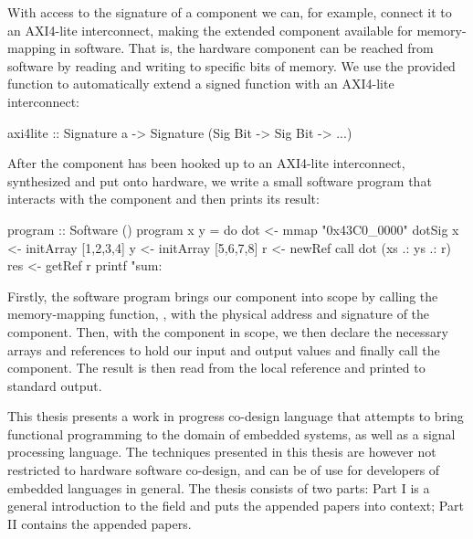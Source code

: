 \documentclass[../main.tex]{subfiles}
\begin{document}
With access to the signature of a component we can, for example, connect it to an AXI4-lite interconnect, making the extended component available for memory-mapping in software. That is, the hardware component can be reached from software by reading and writing to specific bits of memory. We use the provided  function to automatically extend a signed function with an AXI4-lite interconnect:



\begin{code}
axi4lite :: Signature a -> Signature (Sig Bit -> Sig Bit -> ...)
\end{code}

After the component has been hooked up to an AXI4-lite interconnect, synthesized and put onto hardware, we write a small software program that interacts with the component and then prints its result:

\begin{code}
program :: Software ()
program x y = do
  dot <- mmap "0x43C0_0000" dotSig
  x   <- initArray [1,2,3,4]
  y   <- initArray [5,6,7,8]
  r   <- newRef
  call dot (xs .: ys .: r)
  res <- getRef r
  printf "sum: %
\end{code}

\noindent Firstly, the software program brings our component into scope by calling the memory-mapping function, , with the physical address and signature of the component. Then, with the component in scope, we then declare the necessary arrays and references to hold our input and output values and finally call the component. The result is then read from the local reference and printed to standard output.

This thesis presents a work in progress co-design language that attempts to bring functional programming to the domain of embedded systems, as well as a signal processing language. The techniques presented in this thesis are however not restricted to hardware software co-design, and can be of use for developers of embedded languages in general. The thesis consists of two parts: Part I is a general introduction to the field and puts the appended papers into context; Part II contains the appended papers.

\end{document}

